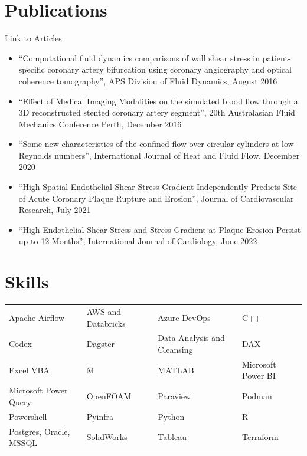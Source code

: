 \documentclass[10pt,a4paper]{article}
\newcommand{\resumesection}[1]{\section*{#1}}
\begin{document}
\resumesection{Publications}
\href{https://1drv.ms/u/s!AqKmu53lUHwmiphhitj54APJmTTs7A?e=oJdxgG}{Link to Articles}
\begin{itemize}
  \item ``Computational fluid dynamics comparisons of wall shear stress in patient-specific coronary artery bifurcation using coronary angiography and optical coherence tomography'', APS Division of Fluid Dynamics, August 2016
  \item ``Effect of Medical Imaging Modalities on the simulated blood flow through a 3D reconstructed stented coronary artery segment'', 20th Australasian Fluid Mechanics Conference Perth, December 2016
  \item ``Some new characteristics of the confined flow over circular cylinders at low Reynolds numbers'', International Journal of Heat and Fluid Flow, December 2020
  \item ``High Spatial Endothelial Shear Stress Gradient Independently Predicts Site of Acute Coronary Plaque Rupture and Erosion'', Journal of Cardiovascular Research, July 2021
  \item ``High Endothelial Shear Stress and Stress Gradient at Plaque Erosion Persist up to 12 Months'', International Journal of Cardiology, June 2022
\end{itemize}

\resumesection{Skills}
\begin{tabularx}{\textwidth}{@{}XXXX@{}}
Apache Airflow & AWS and Databricks & Azure DevOps & C++ \\
Codex & Dagster & Data Analysis and Cleansing & DAX \\
Excel VBA & M & MATLAB & Microsoft Power BI \\
Microsoft Power Query & OpenFOAM & Paraview & Podman \\
Powershell & Pyinfra & Python & R \\
Postgres, Oracle, MSSQL & SolidWorks & Tableau & Terraform \\
\end{tabularx}
\end{document}
